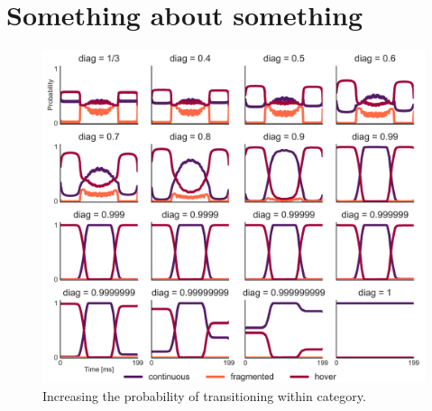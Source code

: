 \documentclass[times, twoside, watermark]{zHenriquesLab-StyleBioRxiv}
\begin{document}
\section{Something about something} \label{note:Note1} 
\Blindtext

\begin{figure}%
\centering
\includegraphics[width=1.0\linewidth]{figures/Supplemental_Figure3.pdf}
\caption{Increasing the probability of transitioning within category.}
\label{fig:Supplemental Figure 3}
\end{figure}

\end{document}
